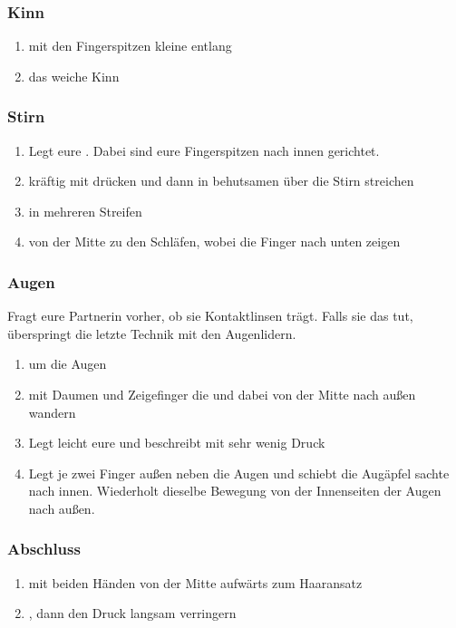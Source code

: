 \subsubsection{Kinn}
\begin{enumerate}
	\item mit den Fingerspitzen kleine  entlang
	\item das weiche Kinn 
\end{enumerate}


\subsubsection{Stirn}

\begin{enumerate}
	\item Legt eure . Dabei sind eure Fingerspitzen nach innen gerichtet.
	\item kräftig mit  drücken und dann in behutsamen  über die Stirn streichen
	\item {} in mehreren Streifen
	\item {} von der Mitte zu den Schläfen, wobei die Finger nach unten zeigen
\end{enumerate}

\subsubsection{Augen}

Fragt eure Partnerin vorher, ob sie Kontaktlinsen trägt. Falls sie das tut, überspringt die letzte Technik mit den Augenlidern.

\begin{enumerate}
	\item {} um die Augen
	\item mit Daumen und Zeigefinger die  und dabei von der Mitte nach außen wandern
	\item Legt leicht eure  und beschreibt mit sehr wenig Druck 
	\item {} Legt je zwei Finger außen neben die Augen und schiebt die Augäpfel sachte nach innen. Wiederholt dieselbe Bewegung von der Innenseiten der Augen nach außen.
\end{enumerate}


\subsubsection{Abschluss}
\begin{enumerate}
	\item {} mit beiden Händen von der Mitte aufwärts zum Haaransatz
	\item {}, dann den Druck langsam verringern
\end{enumerate}
